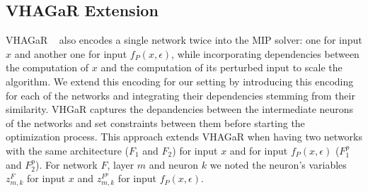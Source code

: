 \subsection{VHAGaR Extension}
VHAGaR ~\cite{VHAGAR} also encodes a single network twice into the MIP solver: one for input $x$ and another one for input $f_P(x,\epsilon)$, while incorporating dependencies between the computation of $x$ and the computation of its perturbed input to scale the algorithm.
We extend this encoding for our setting by introducing this encoding for each of the networks and integrating their dependencies stemming from their similarity. VHGaR captures the depandencies between the intermediate neurons of the networks and set constraints between them before starting the optimization process. This approach extends VHAGaR when having two networks with the same architecture ($F_1$ and $F_2$) for input $x$ and for input $f_P(x,\epsilon)$ ($F^p_1$ and $F^p_2$). For network $F$, layer $m$ and neuron $k$ we noted the neuron's variables $z^F_{m,k}$ for input $x$ and $z^{F^p}_{m,k}$ for input $f_P(x,\epsilon)$.


